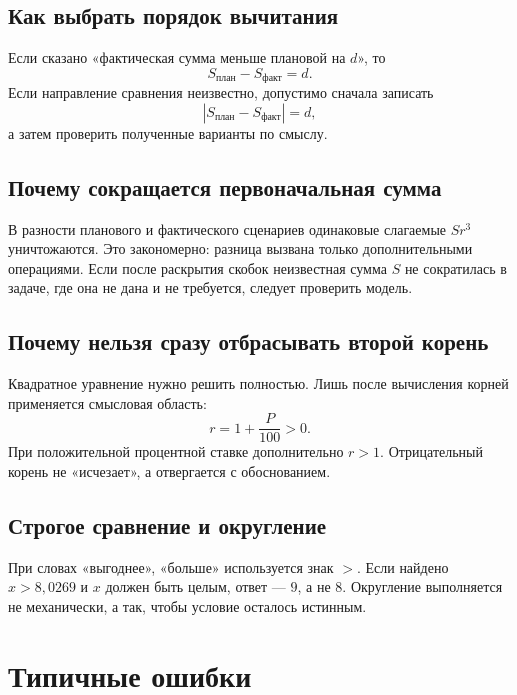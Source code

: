 \documentclass[a4paper,12pt]{article}
\begin{document}
\subsection{Как выбрать порядок вычитания}

Если сказано «фактическая сумма меньше плановой на $d$», то
\[
S_{\text{план}}-S_{\text{факт}}=d.
\]
Если направление сравнения неизвестно, допустимо сначала записать
\[
\left|S_{\text{план}}-S_{\text{факт}}\right|=d,
\]
а затем проверить полученные варианты по смыслу.

\subsection{Почему сокращается первоначальная сумма}

В разности планового и фактического сценариев одинаковые слагаемые $Sr^3$
уничтожаются. Это закономерно: разница вызвана только дополнительными
операциями. Если после раскрытия скобок неизвестная сумма $S$ не сократилась
в задаче, где она не дана и не требуется, следует проверить модель.

\subsection{Почему нельзя сразу отбрасывать второй корень}

Квадратное уравнение нужно решить полностью. Лишь после вычисления корней
применяется смысловая область:
\[
r=1+\frac{P}{100}>0.
\]
При положительной процентной ставке дополнительно $r>1$. Отрицательный корень
не «исчезает», а отвергается с обоснованием.

\subsection{Строгое сравнение и округление}

При словах «выгоднее», «больше» используется знак $>$. Если найдено
$x>8{,}0269$ и $x$ должен быть целым, ответ --- $9$, а не $8$.
Округление выполняется не механически, а так, чтобы условие осталось истинным.

\section{Типичные ошибки}
\end{document}
